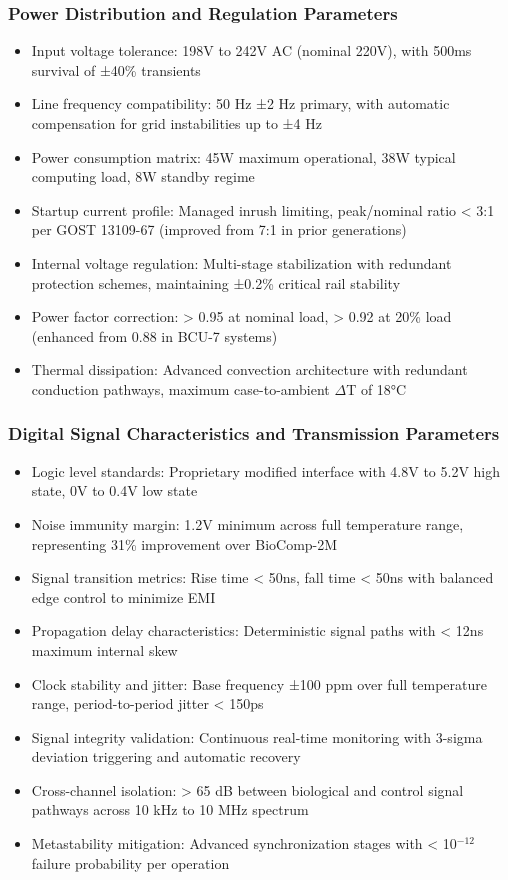 \documentclass[12pt]{article}
\begin{document}
\subsubsection{Power Distribution and Regulation Parameters}
\begin{itemize}
    \item Input voltage tolerance: 198V to 242V AC (nominal 220V), with 500ms survival of ±40\% transients
    \item Line frequency compatibility: 50 Hz ±2 Hz primary, with automatic compensation for grid instabilities up to ±4 Hz
    \item Power consumption matrix: 45W maximum operational, 38W typical computing load, 8W standby regime
    \item Startup current profile: Managed inrush limiting, peak/nominal ratio < 3:1 per GOST 13109-67 (improved from 7:1 in prior generations)
    \item Internal voltage regulation: Multi-stage stabilization with redundant protection schemes, maintaining ±0.2\% critical rail stability
    \item Power factor correction: > 0.95 at nominal load, > 0.92 at 20\% load (enhanced from 0.88 in BCU-7 systems)
    \item Thermal dissipation: Advanced convection architecture with redundant conduction pathways, maximum case-to-ambient $\Delta$T of 18°C
\end{itemize}

\subsubsection{Digital Signal Characteristics and Transmission Parameters}
\begin{itemize}
    \item Logic level standards: Proprietary modified interface with 4.8V to 5.2V high state, 0V to 0.4V low state
    \item Noise immunity margin: 1.2V minimum across full temperature range, representing 31\% improvement over BioComp-2M
    \item Signal transition metrics: Rise time < 50ns, fall time < 50ns with balanced edge control to minimize EMI
    \item Propagation delay characteristics: Deterministic signal paths with < 12ns maximum internal skew
    \item Clock stability and jitter: Base frequency ±100 ppm over full temperature range, period-to-period jitter < 150ps
    \item Signal integrity validation: Continuous real-time monitoring with 3-sigma deviation triggering and automatic recovery
    \item Cross-channel isolation: > 65 dB between biological and control signal pathways across 10 kHz to 10 MHz spectrum
    \item Metastability mitigation: Advanced synchronization stages with < 10$^{-12}$ failure probability per operation
\end{itemize}
\end{document}
